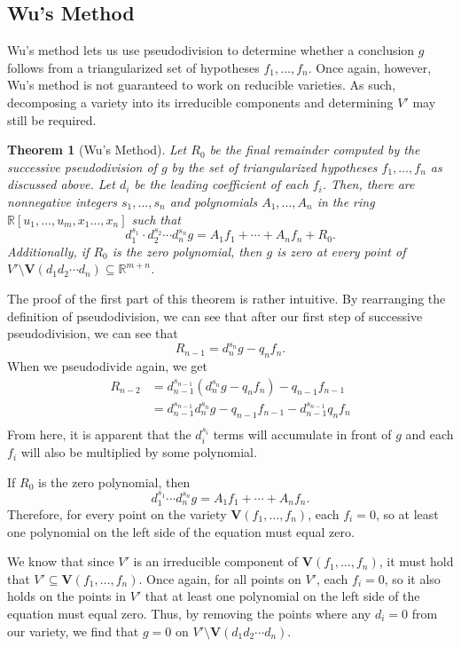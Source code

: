\documentclass{article}
\theoremstyle{plain}
\newtheorem{Theorem}{Theorem}
\theoremstyle{definition}
\theoremstyle{remark}
\begin{document}
\subsection{Wu's Method}
Wu's method lets us use pseudodivision to determine whether a conclusion $g$ follows from a triangularized set of hypotheses $f_1,\dots,f_n$.
Once again, however, Wu's method is not guaranteed to work on reducible varieties. As such, decomposing a variety into its irreducible components and determining $V'$ may still be required.
\begin{Theorem}[Wu's Method]
    Let $R_0$ be the final remainder computed by the successive pseudodivision of $g$ by the set of triangularized hypotheses $f_1,\dots,f_n$ as discussed above.
    Let $d_i$ be the leading coefficient of each $f_i$. 
    Then, there are nonnegative integers $s_1,\dots,s_n$ and polynomials $A_1,\dots,A_n$ in the ring $\mathbb{R}[u_1,\dots,u_m,x_1\dots,x_n]$ such that
    $$d_{1}^{s_1}\cdot d_2^{s_2} \cdots d_n^{s_n} g = A_1 f_1 + \cdots + A_n f_n + R_0.$$
    Additionally, if $R_0$ is the zero polynomial, then $g$ is zero at every point of $V' \setminus \textbf{V}(d_1d_2\cdots d_n) \subseteq \mathbb{R}^{m+n}$.
\end{Theorem}
The proof of the first part of this theorem is rather intuitive. 
By rearranging the definition of pseudodivision, we can see that after our first step of successive pseudodivision, we can see that $$R_{n-1} = d_n^{s_n} g - q_nf_n.$$
When we pseudodivide again, we get
\begin{align*}
    R_{n-2} & = d_{n-1}^{s_{n-1}}(d_n^{s_n} g - q_nf_n) - q_{n-1}f_{n-1}\\
            & = d_{n-1}^{s_{n-1}}d_n^{s_n} g - q_{n-1}f_{n-1} - d_{n-1}^{s_{n-1}}q_nf_n \\
\end{align*}
From here, it is apparent that the $d_i^{s_i}$ terms will accumulate in front of $g$ and each $f_i$ will also be multiplied by some polynomial.

If $R_0$ is the zero polynomial, then $$d_{1}^{s_1} \cdots d_n^{s_n} g = A_1 f_1 + \cdots + A_n f_n.$$
Therefore, for every point on the variety $\textbf{V}(f_1,\dots,f_n)$, each $f_i = 0$, so at least one polynomial on the left side of the equation must equal zero. 

We know that since $V'$ is an irreducible component of $\textbf{V}(f_1,\dots,f_n)$, it must hold that $V' \subseteq \textbf{V}(f_1,\dots,f_n)$.
Once again, for all points on $V'$, each $f_i = 0$, so it also holds on the points in $V'$ that at least one polynomial on the left side of the equation must equal zero.  
Thus, by removing the points where any $d_i = 0$ from our variety, we find that $g = 0$ on $V' \setminus \textbf{V}(d_1d_2\cdots d_n)$. 
\end{document}
